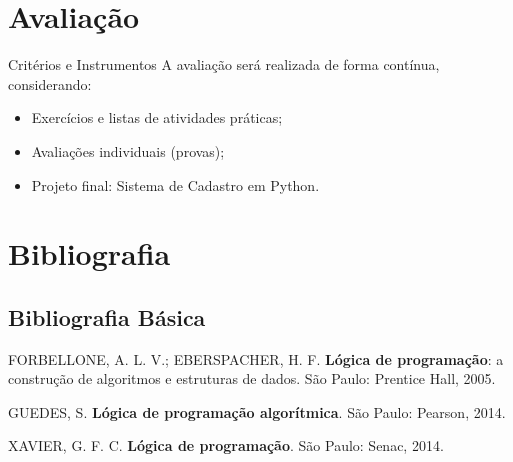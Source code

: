 \documentclass[a4paper,12pt]{article}
\def\faIcon#1{}%
\def\hspace#1{ }%
\begin{document}
\section{\faIcon{chart-bar}\hspace{6pt}Avaliação}

\begin{bloco}[\faIcon{check-circle}]{Critérios e Instrumentos}
A avaliação será realizada de forma contínua, considerando:
\begin{itemize}
  \item Exercícios e listas de atividades práticas;
  \item Avaliações individuais (provas);
  \item Projeto final: Sistema de Cadastro em Python.
\end{itemize}
\end{bloco}

\section{\faIcon{book-open}\hspace{6pt}Bibliografia}

\subsection{\faIcon{bookmark}\hspace{4pt}Bibliografia Básica}
\begin{blocobib}
\begin{enumerate}[leftmargin=1.1cm, label={\textcolor{coracento}{\textbf{[\arabic*]}}}]
  \item FORBELLONE, A. L. V.; EBERSPACHER, H. F. \textbf{Lógica de programação}: a construção de algoritmos e estruturas de dados. São Paulo: Prentice Hall, 2005.
  \item GUEDES, S. \textbf{Lógica de programação algorítmica}. São Paulo: Pearson, 2014.
  \item XAVIER, G. F. C. \textbf{Lógica de programação}. São Paulo: Senac, 2014.
\end{enumerate}
\end{blocobib}
\end{document}
